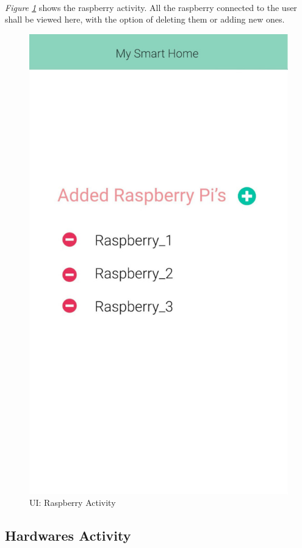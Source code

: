 \documentclass[12pt, oneside, a4paper]{book}
\begin{document}
		\paragraph{} \textit{Figure \ref{fig:activity_raspberry}} shows the raspberry activity. All the raspberry connected to the user shall be viewed here, with the option of deleting them or adding new ones.
		\begin{figure}[H]
			\centering
			\includegraphics[width=.5\linewidth]{img/activity_raspberry.png}
			\caption{UI: Raspberry Activity}
			\label{fig:activity_raspberry}
		\end{figure}
		\newpage\subsection{Hardwares Activity}
\end{document}
